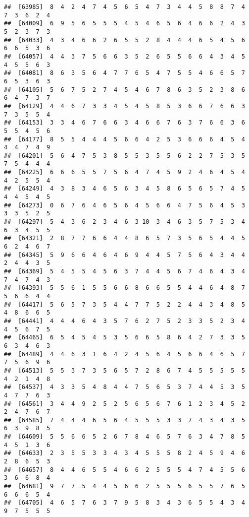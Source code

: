 \documentclass[
]{book}
\begin{document}
\begin{verbatim}
##  [63985]  8  4  2  4  7  4  5  6  5  4  7  3  4  4  5  8  8  7  4  7  3  6  2  4
##  [64009]  6  9  5  6  5  5  5  4  5  4  6  5  6  4  6  6  2  4  3  5  2  3  7  3
##  [64033]  4  3  4  6  6  2  6  5  5  2  8  4  4  4  6  5  4  5  6  6  6  5  3  6
##  [64057]  4  4  3  7  5  6  6  3  5  2  6  5  5  6  6  4  3  4  5  4  5  5  6  3
##  [64081]  8  6  3  5  6  4  7  7  6  5  4  7  5  5  4  6  6  5  7  6  5  3  6  3
##  [64105]  5  6  7  5  2  7  4  5  4  6  7  8  6  3  5  2  3  8  6  6  4  7  3  7
##  [64129]  4  4  6  7  3  3  4  5  4  5  8  5  3  6  6  7  6  6  3  7  3  5  5  4
##  [64153]  3  3  4  6  7  6  6  3  4  6  6  7  6  3  7  6  6  3  6  5  5  4  5  6
##  [64177]  8  5  5  4  4  4  5  6  6  4  2  5  3  6  6  6  4  5  4  4  4  7  4  9
##  [64201]  5  6  4  7  5  3  8  5  5  3  5  5  6  2  2  7  5  3  5  7  5  4  4  4
##  [64225]  6  6  6  5  5  7  5  6  4  7  4  5  9  2  4  6  4  5  4  4  2  5  5  4
##  [64249]  4  3  8  3  4  6  5  6  3  4  5  8  6  5  6  5  7  4  5  4  4  5  4  5
##  [64273]  0  6  7  6  4  6  5  6  4  5  6  6  4  7  5  6  4  5  3  3  3  5  2  5
##  [64297]  5  4  3  6  2  3  4  6  3 10  3  4  6  3  5  7  5  3  4  6  3  4  5  5
##  [64321]  2  8  7  7  6  6  4  4  8  6  5  7  3  5  6  5  4  4  5  6  2  4  6  7
##  [64345]  5  9  6  6  4  6  4  6  9  4  4  5  7  5  6  4  3  4  4  2  4  4  3  5
##  [64369]  5  4  5  5  4  5  6  3  7  4  4  5  6  7  4  6  4  3  4  7  4  7  4  3
##  [64393]  5  5  6  1  5  5  6  6  8  6  6  5  5  4  4  6  4  8  7  5  6  6  4  4
##  [64417]  5  6  5  7  3  5  4  4  7  7  5  2  2  4  4  3  4  8  5  4  8  6  6  5
##  [64441]  4  4  4  6  4  3  5  7  6  2  7  5  2  3  3  5  2  3  4  4  5  6  7  5
##  [64465]  6  5  4  5  4  5  3  5  6  6  5  8  6  4  2  7  3  3  5  6  3  4  6  3
##  [64489]  4  4  6  3  1  6  4  2  4  5  6  4  5  6  6  4  6  5  7  7  5  6  9  6
##  [64513]  5  5  3  7  3  5  6  5  7  2  8  6  7  4  5  5  5  5  5  4  2  1  4  8
##  [64537]  4  3  3  5  4  8  4  4  7  5  6  5  3  7  4  4  5  3  5  4  7  7  6  3
##  [64561]  3  4  4  9  2  5  2  5  6  5  6  7  6  1  2  3  4  5  2  2  4  7  6  7
##  [64585]  7  4  4  4  6  5  6  4  5  5  5  3  3  7  4  3  4  3  5  6  3  9  8  5
##  [64609]  5  5  6  6  5  2  6  7  8  4  6  5  7  6  3  4  7  8  5  4  5  1  3  6
##  [64633]  2  3  5  5  3  3  4  3  4  5  5  5  8  2  4  5  9  4  6  2  8  6  5  3
##  [64657]  8  4  4  6  5  5  4  6  6  2  5  5  5  4  7  4  5  5  6  3  6  6  8  4
##  [64681]  9  7  7  5  4  4  5  6  6  2  5  5  5  6  5  5  7  6  5  6  6  6  5  4
##  [64705]  4  6  5  7  6  3  7  9  5  8  3  4  3  6  5  5  4  3  4  9  7  5  5  5

\end{verbatim}
\end{document}
